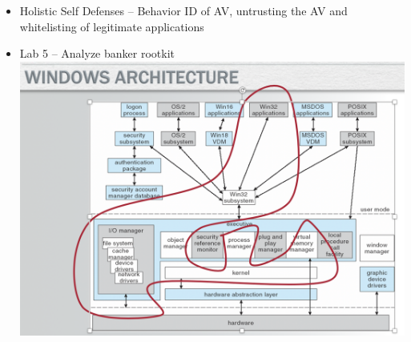 \documentclass[12pt]{article}
\begin{document}
\begin{itemize}
\item Holistic Self Defenses – Behavior ID of AV, untrusting the AV and whitelisting of legitimate applications
\item Lab 5 – Analyze banker rootkit
\includegraphics{9.png}
\end{itemize}
 
\end{document}
